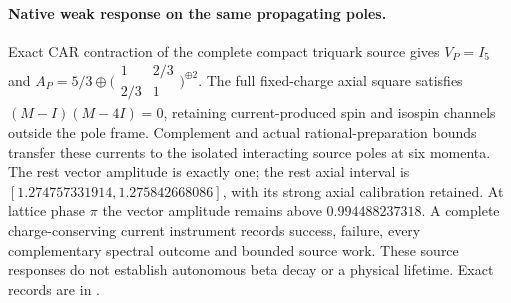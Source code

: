 \paragraph{Native weak response on the same propagating poles.}
Exact CAR contraction of the complete compact triquark source gives
$V_P=I_5$ and
$A_P=5/3\oplus\bigl(\begin{smallmatrix}1&2/3\\2/3&1\end{smallmatrix}\bigr)^{\oplus2}$.
The full fixed-charge axial square satisfies $(M-I)(M-4I)=0$, retaining
current-produced spin and isospin channels outside the pole frame.
Complement and actual rational-preparation bounds transfer these currents
to the isolated interacting source poles at six momenta. The rest vector
amplitude is exactly one; the rest axial interval is
$[1.274757331914,1.275842668086]$, with its strong axial calibration
retained. At lattice phase $\pi$ the vector amplitude remains above
$0.994488237318$. A complete charge-conserving current instrument records
success, failure, every complementary spectral outcome and bounded source
work. These source responses do not establish autonomous beta decay or a
physical lifetime. Exact records are in
.
